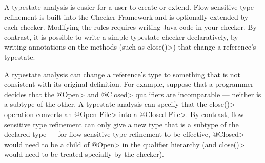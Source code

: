 A typestate analysis is easier for a user to create or extend.
Flow-sensitive type refinement is built into the Checker Framework and is
optionally extended by each checker.  Modifying the rules requires writing
Java code in your checker.  By contrast, it is possible to write a simple
typestate checker declaratively, by writing annotations on the methods
(such as \<close()>) that change a reference's typestate.

A typestate analysis can change a reference's type to something that is not
consistent with its original definition.  For example, suppose that a
programmer decides that the \<@Open> and \<@Closed> qualifiers are
incomparable --- neither is a subtype of the other.  A typestate analysis
can specify that the \<close()> operation converts an \<@Open File> into a
\<@Closed File>.  By contrast, flow-sensitive type refinement can only give
a new type that is a subtype of the declared type --- for flow-sensitive
type refinement to be effective, \<@Closed> would need to be a child of
\<@Open> in the qualifier hierarchy (and \<close()> would need to be
treated specially by the checker).
